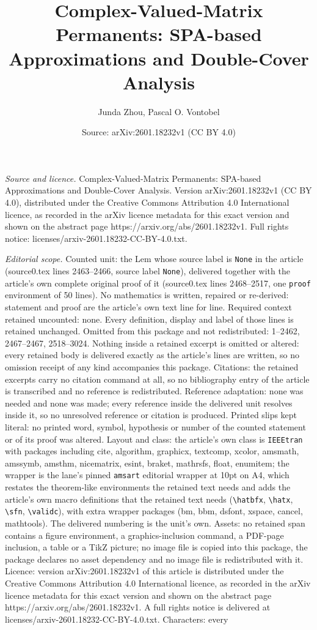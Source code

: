 \documentclass[10pt,a4paper]{amsart}
\title[Complex-Valued-Matrix Permanents: SPA-based Approximations a]{Complex-Valued-Matrix Permanents: SPA-based Approximations and Double-Cover Analysis}
\author{Junda Zhou, Pascal O. Vontobel}
\date{Source: arXiv:2601.18232v1 (CC BY 4.0)}
\begin{document}
\maketitle

\noindent\emph{Source and licence.} Complex-Valued-Matrix Permanents: SPA-based Approximations and Double-Cover Analysis. Version arXiv:2601.18232v1 (CC BY 4.0), distributed under the Creative Commons Attribution 4.0 International licence, as recorded in the arXiv licence metadata for this exact version and shown on the abstract page https://arxiv.org/abs/2601.18232v1. Full rights notice: licenses/arxiv-2601.18232-CC-BY-4.0.txt.\par\smallskip

\noindent\textit{Editorial scope.} Counted unit: the Lem whose source label is \texttt{None} in the article (source0.tex lines 2463--2466, source label \texttt{None}), delivered together with the article's own complete original proof of it (source0.tex lines 2468--2517, one \texttt{proof} environment of 50 lines). No mathematics is written, repaired or re-derived: statement and proof are the article's own text line for line. Required context retained uncounted: none. Every definition, display and label of those lines is retained unchanged. Omitted from this package and not redistributed: 1--2462, 2467--2467, 2518--3024. Nothing inside a retained excerpt is omitted or altered: every retained body is delivered exactly as the article's lines are written, so no omission receipt of any kind accompanies this package. Citations: the retained excerpts carry no citation command at all, so no bibliography entry of the article is transcribed and no reference is redistributed. Reference adaptation: none was needed and none was made; every reference inside the delivered unit resolves inside it, so no unresolved reference or citation is produced. Printed slips kept literal: no printed word, symbol, hypothesis or number of the counted statement or of its proof was altered. Layout and class: the article's own class is \texttt{IEEEtran} with packages including cite, algorithm, graphicx, textcomp, xcolor, amsmath, amssymb, amsthm, nicematrix, esint, braket, mathrsfs, float, enumitem; the wrapper is the lane's pinned \texttt{amsart} editorial wrapper at 10pt on A4, which restates the theorem-like environments the retained text needs and adds the article's own macro definitions that the retained text needs (\texttt{\textbackslash hatbfx}, \texttt{\textbackslash hatx}, \texttt{\textbackslash sfn}, \texttt{\textbackslash validc}), with extra wrapper packages (bm, bbm, dsfont, xspace, cancel, mathtools). The delivered numbering is the unit's own. Assets: no retained span contains a figure environment, a graphics-inclusion command, a PDF-page inclusion, a table or a TikZ picture; no image file is copied into this package, the package declares no asset dependency and no image file is redistributed with it. Licence: version arXiv:2601.18232v1 of this article is distributed under the Creative Commons Attribution 4.0 International licence, as recorded in the arXiv licence metadata for this exact version and shown on the abstract page https://arxiv.org/abs/2601.18232v1. A full rights notice is delivered at licenses/arxiv-2601.18232-CC-BY-4.0.txt. Characters: every 
\end{document}
